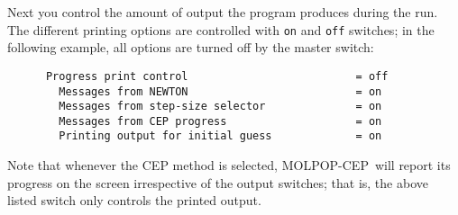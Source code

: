 \documentclass[12pt]{article}
\def\M{MOLPOP-CEP}
\begin{document}
Next you control the amount of output the program produces during the run. The
different printing options are controlled with {\tt on} and {\tt off} switches;
in the following example, all options are turned off by the master switch:
\begin{verbatim}
      Progress print control                          = off
        Messages from NEWTON                          = on
        Messages from step-size selector              = on
        Messages from CEP progress                    = on
        Printing output for initial guess             = on
\end{verbatim}
Note that whenever the CEP method is selected, \M\ will report its progress on
the screen irrespective of the output switches; that is, the above listed
switch only controls the printed output.
\end{document}
